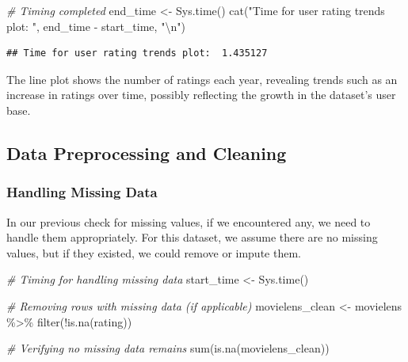 \documentclass[
]{article}
\newenvironment{Shaded}{}{}
\newcommand{\CommentTok}[1]{\textcolor[rgb]{0.38,0.63,0.69}{\textit{#1}}}
\newcommand{\FunctionTok}[1]{\textcolor[rgb]{0.02,0.16,0.49}{#1}}
\newcommand{\NormalTok}[1]{#1}
\newcommand{\OtherTok}[1]{\textcolor[rgb]{0.00,0.44,0.13}{#1}}
\newcommand{\SpecialCharTok}[1]{\textcolor[rgb]{0.25,0.44,0.63}{#1}}
\newcommand{\StringTok}[1]{\textcolor[rgb]{0.25,0.44,0.63}{#1}}
\begin{document}
\begin{Shaded}
\begin{Highlighting}[]
\CommentTok{\# Timing completed}
\NormalTok{end\_time }\OtherTok{\textless{}{-}} \FunctionTok{Sys.time}\NormalTok{()}
\FunctionTok{cat}\NormalTok{(}\StringTok{"Time for user rating trends plot: "}\NormalTok{, end\_time }\SpecialCharTok{{-}}\NormalTok{ start\_time, }\StringTok{"}\SpecialCharTok{\textbackslash{}n}\StringTok{"}\NormalTok{)}
\end{Highlighting}
\end{Shaded}

\begin{verbatim}
## Time for user rating trends plot:  1.435127
\end{verbatim}

The line plot shows the number of ratings each year, revealing trends
such as an increase in ratings over time, possibly reflecting the growth
in the dataset's user base.

\subsection{Data Preprocessing and
Cleaning}\label{data-preprocessing-and-cleaning}

\subsubsection{Handling Missing Data}\label{handling-missing-data}

In our previous check for missing values, if we encountered any, we need
to handle them appropriately. For this dataset, we assume there are no
missing values, but if they existed, we could remove or impute them.

\begin{Shaded}
\begin{Highlighting}[]
\CommentTok{\# Timing for handling missing data}
\NormalTok{start\_time }\OtherTok{\textless{}{-}} \FunctionTok{Sys.time}\NormalTok{()}

\CommentTok{\# Removing rows with missing data (if applicable)}
\NormalTok{movielens\_clean }\OtherTok{\textless{}{-}}\NormalTok{ movielens }\SpecialCharTok{\%\textgreater{}\%}
  \FunctionTok{filter}\NormalTok{(}\SpecialCharTok{!}\FunctionTok{is.na}\NormalTok{(rating))}

\CommentTok{\# Verifying no missing data remains}
\FunctionTok{sum}\NormalTok{(}\FunctionTok{is.na}\NormalTok{(movielens\_clean))}
\end{Highlighting}
\end{Shaded}
\end{document}

